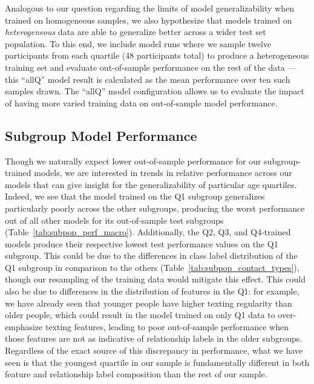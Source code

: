 \documentclass[acmlarge]{acmart}
\begin{document}

Analogous to our question regarding the limits of model generalizability when trained on homogeneous samples, we also hypothesize that models trained on \textit{heterogeneous} data are able to generalize better across a wider test set population. To this end, we include model runs where we sample twelve participants from each quartile (48 participants total) to produce a heterogeneous training set and evaluate out-of-sample performance on the rest of the data --- this ``allQ'' model result is calculated as the mean performance over ten such samples drawn. The ``allQ'' model configuration allows us to evaluate the impact of having more varied training data on out-of-sample model performance.

\subsection{Subgroup Model Performance}




Though we naturally expect lower out-of-sample performance for our subgroup-trained models, we are interested in trends in relative performance across our models that can give insight for the generalizability of particular age quartiles. Indeed, we see that the model trained on the Q1 subgroup generalizes particularly poorly across the other subgroups, producing the worst performance out of all other models for its out-of-sample test subgroups (Table~\ref{tab:subpop_perf_macro}). Additionally, the Q2, Q3, and Q4-trained models produce their respective lowest test performance values on the Q1 subgroup. This could be due to the differences in class label distribution of the Q1 subgroup in comparison to the others (Table~\ref{tab:subpop_contact_types}), though our resampling of the training data would mitigate this effect. This could also be due to differences in the distribution of features in the Q1: for example, we have already seen that younger people have higher texting regularity than older people, which could result in the model trained on only Q1 data to over-emphasize texting features, leading to poor out-of-sample performance when those features are not as indicative of relationship labels in the older subgroups. Regardless of the exact source of this discrepancy in performance, what we have seen is that the youngest quartile in our sample is fundamentally different in both feature and relationship label composition than the rest of our sample. 
\end{document}
